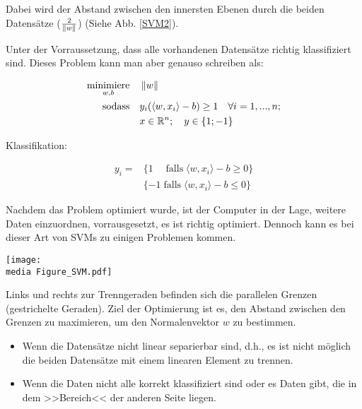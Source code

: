 Dabei wird der Abstand zwischen den innersten Ebenen durch die beiden Datensätze ($\frac{2}{\left\lVert w\right\rVert}$) (Siehe Abb. \ref{SVM2}).

Unter der Vorraussetzung, dass alle vorhandenen Datensätze richtig klassifiziert sind. Dieses Problem kann 
man aber genauso schreiben als:

\begin{align*}
		\underset{w,b}{\operatorname{minimiere}} \quad & \left\lVert w\right\rVert \\
		\operatorname{sodass} \quad &y_{i}(\langle w,x_{i} \rangle -b) \geq 1 \quad \forall i = 1,...,n ; \\
		&x \in \mathbb{R}^n; \quad y \in \{1; -1\}
\end{align*}

Klassifikation:

\begin{align*}
	y_{i} =& \{ 1 \quad \operatorname{falls} \langle w,x_{i} \rangle - b \geq 0\} \\
		& \{ -1 \operatorname{falls} \langle w,x_{i} \rangle - b \leq 0\}
\end{align*}

Nachdem das Problem optimiert wurde, ist der Computer in der Lage, weitere Daten einzuordnen, vorrausgesetzt, es ist richtig optimiert.
Dennoch kann es bei dieser Art von SVMs zu einigen Problemen kommen.\\

\begin{dsafigure}
	\begin{center}
		\texttt{[image: \\media Figure\_SVM.pdf]}
		\caption{Links und rechts zur Trenngeraden befinden sich die parallelen Grenzen (gestrichelte Geraden). Ziel der Optimierung ist es, den Abstand zwischen den Grenzen zu maximieren, um den Normalenvektor $w$ zu bestimmen.}
		\label{SVM2}
	\end{center}
\end{dsafigure}

\begin{itemize}
	\item Wenn die Datensätze nicht linear separierbar sind, d.h., es ist nicht möglich die beiden Datensätze mit einem linearen Element zu trennen.
	
	\item Wenn die Daten nicht alle korrekt klassifiziert sind oder es Daten gibt, die in dem >>Bereich<< der anderen Seite liegen.
\end{itemize}


